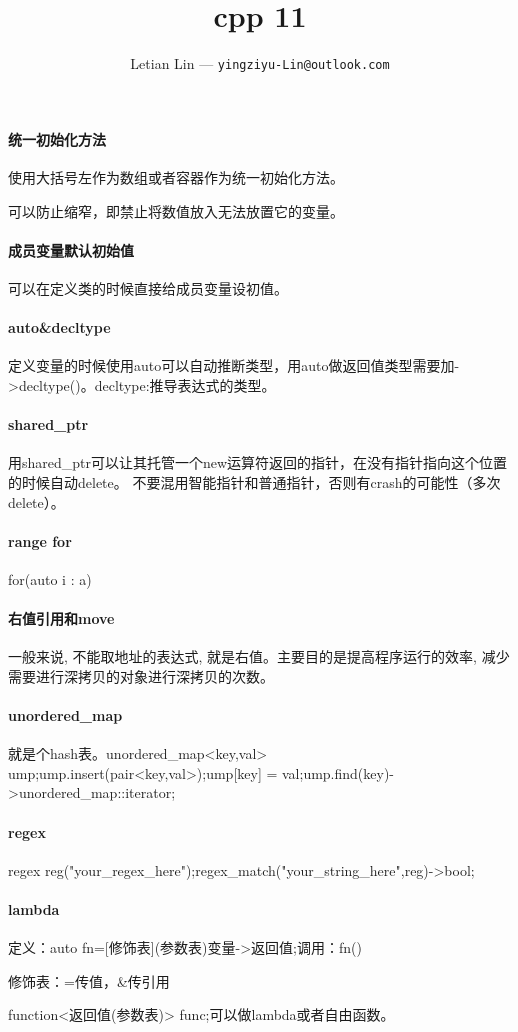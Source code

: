 \documentclass[UTF8]{ctexart}
\title{
	cpp 11
}
\author{
	Letian Lin --- \texttt{yingziyu-Lin@outlook.com}
}
\begin{document}
\maketitle
\paragraph{统一初始化方法}使用大括号左作为数组或者容器作为统一初始化方法。

可以防止缩窄，即禁止将数值放入无法放置它的变量。

\paragraph{成员变量默认初始值}
可以在定义类的时候直接给成员变量设初值。

\paragraph{auto\&decltype}定义变量的时候使用auto可以自动推断类型，用auto做返回值类型需要加->decltype()。decltype:推导表达式的类型。

\paragraph{shared_ptr}用shared_ptr可以让其托管一个new运算符返回的指针，在没有指针指向这个位置的时候自动delete。
不要混用智能指针和普通指针，否则有crash的可能性（多次delete）。

\paragraph{range for}for(auto i : a)

\paragraph{右值引用和move}一般来说, 不能取地址的表达式, 就是右值。主要目的是提高程序运行的效率, 减少需要进行深拷贝的对象进行深拷贝的次数。

\paragraph{unordered_map}就是个hash表。unordered_map<key,val> ump;ump.insert(pair<key,val>);ump[key] = val;ump.find(key)->unordered_map::iterator;

\paragraph{regex}regex reg("your_regex_here");regex_match("your_string_here",reg)->bool;

\paragraph{lambda}定义：auto fn=[修饰表](参数表){变量}->返回值;调用：fn()

修饰表：=传值，\&传引用

function<返回值(参数表)> func;可以做lambda或者自由函数。
\end{document}
